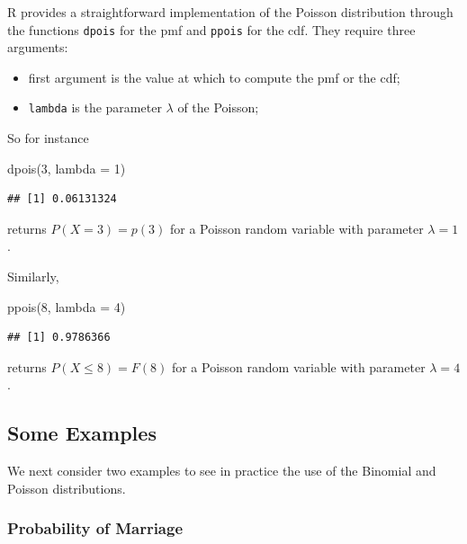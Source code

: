 \documentclass[
]{book}
\newenvironment{Shaded}{\begin{snugshade}}{\end{snugshade}}
\newcommand{\AttributeTok}[1]{\textcolor[rgb]{0.77,0.63,0.00}{#1}}
\newcommand{\DecValTok}[1]{\textcolor[rgb]{0.00,0.00,0.81}{#1}}
\newcommand{\FunctionTok}[1]{\textcolor[rgb]{0.00,0.00,0.00}{#1}}
\newcommand{\NormalTok}[1]{#1}
\theoremstyle{definition}
\theoremstyle{definition}
\theoremstyle{definition}
\theoremstyle{definition}
\theoremstyle{remark}
\begin{document}
R provides a straightforward implementation of the Poisson distribution through the functions \texttt{dpois} for the pmf and \texttt{ppois} for the cdf. They require three arguments:

\begin{itemize}
\item
  first argument is the value at which to compute the pmf or the cdf;
\item
  \texttt{lambda} is the parameter \(\lambda\) of the Poisson;
\end{itemize}

So for instance

\begin{Shaded}
\begin{Highlighting}[]
\FunctionTok{dpois}\NormalTok{(}\DecValTok{3}\NormalTok{, }\AttributeTok{lambda =} \DecValTok{1}\NormalTok{)}
\end{Highlighting}
\end{Shaded}

\begin{verbatim}
## [1] 0.06131324
\end{verbatim}

returns \(P(X=3)=p(3)\) for a Poisson random variable with parameter \(\lambda = 1\).

Similarly,

\begin{Shaded}
\begin{Highlighting}[]
\FunctionTok{ppois}\NormalTok{(}\DecValTok{8}\NormalTok{, }\AttributeTok{lambda =} \DecValTok{4}\NormalTok{)}
\end{Highlighting}
\end{Shaded}

\begin{verbatim}
## [1] 0.9786366
\end{verbatim}

returns \(P(X\leq 8) = F(8)\) for a Poisson random variable with parameter \(\lambda = 4\).

\hypertarget{some-examples}{%
\subsection{Some Examples}\label{some-examples}}

We next consider two examples to see in practice the use of the Binomial and Poisson distributions.

\hypertarget{probability-of-marriage}{%
\subsubsection{Probability of Marriage}\label{probability-of-marriage}}
\end{document}

